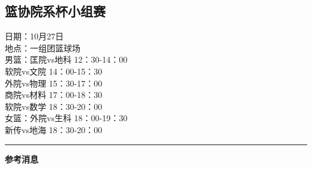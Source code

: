 \documentclass[letterpaper, 12pt]{article}
\begin{document}
\begin{multicols}{2}
\section{篮协院系杯小组赛}
日期：10月27日\\
地点：一组团篮球场\\
男篮：匡院vs地科  12：30-14：00\\
软院vs文院 14：00-15：30\\
外院vs物理 15：30-17：00\\
商院vs材料 17：00-18：30\\
软院vs数学 18：30-20：00\\
女篮：外院vs生科 18：00-19：30\\
新传vs地海 18：30-20：00\\
\end{multicols} 
\hrule
\vspace{4mm}
\centerline{\huge\textbf{参考消息}}
\end{document}
